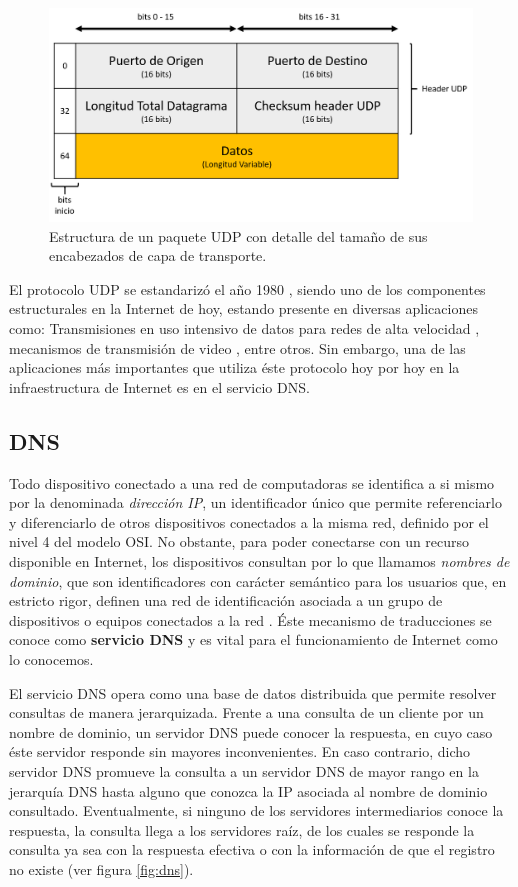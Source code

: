 \begin{figure}[!h]
	\centering
	\includegraphics[scale=.55]{imagenes/estructuraUDP.png}
	\caption{Estructura de un paquete UDP con detalle del tamaño de sus encabezados de capa de transporte.}
	\label{fig:datagramaudp}
\end{figure}

El protocolo UDP se estandarizó el año 1980 \cite{rfc:768}, siendo uno de los componentes estructurales en la Internet de hoy, estando presente en diversas aplicaciones como: Transmisiones en uso intensivo de datos para redes de alta velocidad \cite{udp:highbandwidth}, mecanismos de transmisión de video \cite{udp:video}, entre otros. Sin embargo, una de las aplicaciones más importantes que utiliza éste protocolo hoy por hoy en la infraestructura de Internet es en el servicio DNS.

\subsection{DNS}
Todo dispositivo conectado a una red de computadoras se identifica a si mismo por la denominada \emph{dirección IP}, un identificador único que permite referenciarlo y diferenciarlo de otros dispositivos conectados a la misma red, definido por el nivel 4 del modelo OSI. No obstante, para poder conectarse con un recurso disponible en Internet, los dispositivos consultan por lo que llamamos \emph{nombres de dominio}, que son identificadores con carácter semántico para los usuarios que, en estricto rigor, definen una red de identificación asociada a un grupo de dispositivos o equipos conectados a la red \cite{wiki:nombre_dominio}. Éste mecanismo de traducciones se conoce como \textbf{servicio DNS} y es vital para el funcionamiento de Internet como lo conocemos.

El servicio DNS \cite{rfc:1034, rfc:1035} opera como una base de datos distribuida que permite resolver consultas de manera jerarquizada. Frente a una consulta de un cliente por un nombre de dominio, un servidor DNS puede conocer la respuesta, en cuyo caso éste servidor responde sin mayores inconvenientes. En caso contrario, dicho servidor DNS promueve la consulta a un servidor DNS de mayor rango en la jerarquía DNS hasta alguno que conozca la IP asociada al nombre de dominio consultado. Eventualmente, si ninguno de los servidores intermediarios conoce la respuesta, la consulta llega a los servidores raíz, de los cuales se responde la consulta ya sea con la respuesta efectiva o con la información de que el registro no existe (ver figura \ref{fig:dns}).


